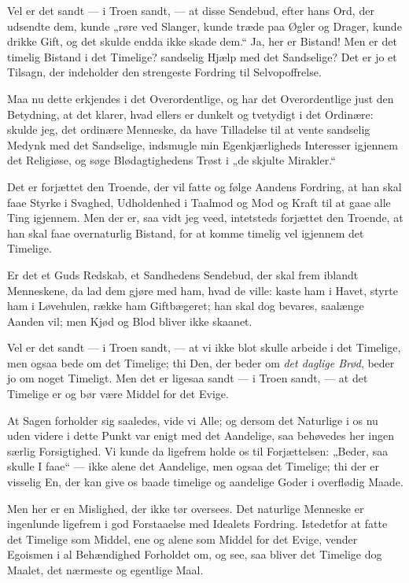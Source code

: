 \documentclass[12pt,a4paper]{book}
\newcommand{\apage}[1]{\marginnote{\footnotesize\textit{[#1]}}}
\begin{document}
Vel er det sandt --- i Troen sandt, --- at disse Sendebud, efter hans
Ord, der udsendte dem, kunde „røre ved \apage{137}
Slanger, kunde træde paa Øgler og Drager, kunde drikke Gift, og det
skulde endda ikke skade dem.“ Ja, her er Bistand! Men er det
timelig Bistand i det Timelige? sandselig Hjælp med det
Sandselige? Det er jo et Tilsagn, der indeholder den strengeste
Fordring til Selvopoffrelse.

Maa nu dette erkjendes i det Overordentlige, og har det
Overordentlige just den Betydning, at det klarer, hvad ellers er
dunkelt og tvetydigt i det Ordinære: skulde jeg, det ordinære
Menneske, da have Tilladelse til at vente sandselig Medynk med det
Sandselige, indsmugle min Egenkjærligheds Interesser igjennem det
Religiøse, og søge Blødagtighedens Trøst i „de skjulte Mirakler.“

Det er forjættet den Troende, der vil fatte og følge Aandens
Fordring, at han skal faae Styrke i Svaghed, Udholdenhed i
Taalmod og Mod og Kraft til at gaae alle Ting igjennem. Men der
er, saa vidt jeg veed, intetsteds forjættet den Troende, at han skal
faae overnaturlig Bistand, for at komme timelig vel igjennem det
Timelige.

Er det et Guds Redskab, et Sandhedens Sendebud, der skal frem
iblandt Menneskene, da lad dem gjøre med ham, hvad de ville: kaste
ham i Havet, styrte ham i Løvehulen, række ham Giftbægeret; han
skal dog bevares, saalænge Aanden vil; men Kjød og Blod bliver
ikke skaanet.

Vel er det sandt --- i Troen sandt, --- at vi ikke blot skulle arbeide i
det Timelige, men ogsaa bede om det Timelige; thi Den, der beder
om \emph{det daglige Brød}, beder jo om noget Timeligt. Men det er
ligesaa sandt --- i Troen sandt, --- at det Timelige er og bør være
Middel for det Evige.

At Sagen forholder sig saaledes, vide vi Alle; og dersom det
Naturlige i os nu uden videre i dette Punkt var enigt med det
Aandelige, saa behøvedes her ingen særlig Forsigtighed. Vi kunde
da ligefrem holde os til Forjættelsen: „Beder, saa skulle I faae“ ---
ikke alene det Aandelige, men \apage{138}
ogsaa det Timelige; thi der er visselig En, der kan give os baade
timelige og aandelige Goder i overflødig Maade.

Men her er en Mislighed, der ikke tør oversees. Det naturlige
Menneske er ingenlunde ligefrem i god Forstaaelse med Idealets
Fordring. Istedetfor at fatte det Timelige som Middel, ene og alene
som Middel for det Evige, vender Egoismen i al Behændighed
Forholdet om, og see, saa bliver det Timelige dog Maalet, det
nærmeste og egentlige Maal.
\end{document}
